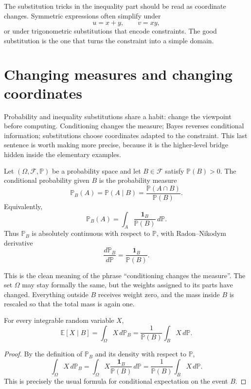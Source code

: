 The substitution tricks in the inequality part should be read as coordinate changes.  Symmetric expressions often simplify under
\[
  u=x+y,\qquad v=xy,
\]
or under trigonometric substitutions that encode constraints.  The good substitution is the one that turns the constraint into a simple domain.

\section{Changing measures and changing coordinates}

Probability and inequality substitutions share a habit: change the viewpoint before computing.  Conditioning changes the measure; Bayes reverses conditional information; substitutions choose coordinates adapted to the constraint.  This last sentence is worth making more precise, because it is the higher-level bridge hidden inside the elementary examples.

\begin{definition}
Let \((\Omega,\mathcal F,\mathbb P)\) be a probability space and let \(B\in\mathcal F\) satisfy \(\mathbb P(B)>0\).  The conditional probability given \(B\) is the probability measure
\[
  \mathbb P_B(A)=\mathbb P(A\mid B)
  =\frac{\mathbb P(A\cap B)}{\mathbb P(B)}.
\]
Equivalently,
\[
  \mathbb P_B(A)=\int_A \frac{\mathbf 1_B}{\mathbb P(B)}\,d\mathbb P.
\]
Thus \(\mathbb P_B\) is absolutely continuous with respect to \(\mathbb P\), with Radon--Nikodym derivative
\[
  \frac{d\mathbb P_B}{d\mathbb P}=\frac{\mathbf 1_B}{\mathbb P(B)}.
\]
\end{definition}

This is the clean meaning of the phrase ``conditioning changes the measure''.  The set \(\Omega\) may stay formally the same, but the weights assigned to its parts have changed.  Everything outside \(B\) receives weight zero, and the mass inside \(B\) is rescaled so that the total mass is again one.

\begin{proposition}
For every integrable random variable \(X\),
\[
  \mathbb E[X\mid B]
  =\int_{\Omega}X\,d\mathbb P_B
  =\frac{1}{\mathbb P(B)}\int_B X\,d\mathbb P.
\]
\end{proposition}

\begin{proof}
By the definition of \(\mathbb P_B\) and its density with respect to \(\mathbb P\),
\[
  \int_{\Omega}X\,d\mathbb P_B
  =\int_{\Omega}X\frac{\mathbf 1_B}{\mathbb P(B)}\,d\mathbb P
  =\frac{1}{\mathbb P(B)}\int_B X\,d\mathbb P.
\]
This is precisely the usual formula for conditional expectation on the event \(B\).
\end{proof}

